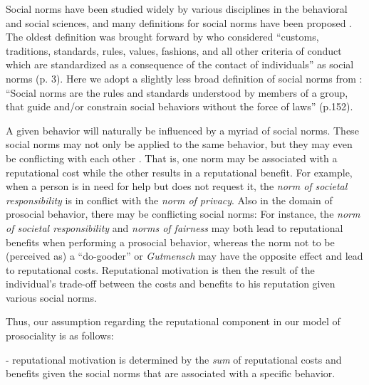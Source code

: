 \documentclass[AER]{AEA}
\begin{document}
Social norms have been studied widely by various disciplines in the behavioral and social sciences, and many definitions for social norms have been proposed \citep{wallen_social_2017}. The oldest definition was brought forward by \cite{sherif_psychology_1936} who considered “customs, traditions, standards, rules, values, fashions, and all other criteria of conduct which are standardized as a consequence of the contact of individuals” as social norms (p. 3). Here we adopt a slightly less broad definition of social norms from \cite{cialdini_social_1998}: “Social norms are the rules and standards understood by members of a group, that guide and/or constrain social behaviors without the force of laws” (p.152).

A given behavior will naturally be influenced by a myriad of social norms. These social norms may not only be applied to the same behavior, but they may even be conflicting with each other \citep{cialdini_social_1998}. That is, one norm may be associated with a reputational cost while the other results in a reputational benefit. For example, when a person is in need for help but does not request it, the \textit{norm of societal responsibility} is in conflict with the \textit{norm of privacy}. Also in the domain of prosocial behavior, there may be conflicting social norms: For instance, the \textit{norm of societal responsibility} \citep{cialdini_social_1998} and \textit{norms of fairness} \citep{fehr_theory_1999} may both lead to reputational benefits when performing a prosocial behavior, whereas the norm not to be (perceived as) a “do-gooder” or \textit{Gutmensch} \cite[see do-gooder derogation, which is the putting down of morally motivated others; ][]{minson_-gooder_2012, tasimi_-gooder_2015} may have the opposite effect and lead to reputational costs. Reputational motivation is then the result of the individual’s trade-off between the costs and benefits to his reputation given various social norms.

Thus, our assumption regarding the reputational component in our model of prosociality is as follows:

	- reputational motivation is determined by the \textit{sum} of reputational costs and benefits given the social norms that are associated with a specific behavior.
	
\end{document}
